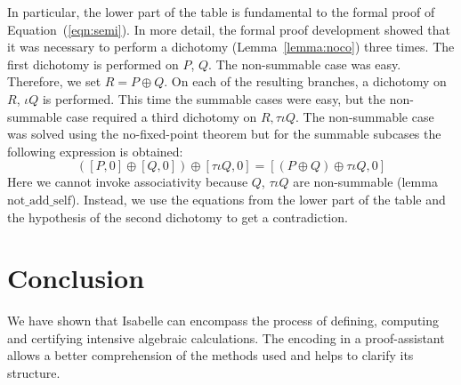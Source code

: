 \documentclass{llncs}
\begin{document}
In particular, the lower part of the table is fundamental to the formal
proof of
Equation~(\ref{eqn:semi}).
In more detail, the formal proof development showed that it was
necessary to perform a dichotomy (Lemma~\ref{lemma:noco}) three
times. The first dichotomy is performed on $P$, $Q$. The non-summable
case was easy. Therefore, we set $R = P \oplus Q$. On each of the
resulting branches, a dichotomy on $R$, $\iota Q$ is performed. This
time the summable cases were easy, but the non-summable case required a
third dichotomy on $R,\tau \iota Q$. The non-summable case was solved
using the no-fixed-point theorem but for the summable subcases the
following expression is obtained:
\[
([P,0] \oplus [Q,0]) \oplus [\tau \iota Q,0] =
[(P \oplus Q) \oplus \tau \iota Q,0]
\] 
Here we cannot invoke associativity because $Q$, $\tau \iota Q$ are
non-summable (lemma $\text{not\_add\_self}$).  Instead, we use the
equations from the lower part of the table and the hypothesis of the
second dichotomy to get a contradiction.

\section{Conclusion}

We have shown that Isabelle can encompass the process
of defining, computing and certifying intensive algebraic
calculations. The encoding in a proof-assistant allows a better
comprehension of the methods used and helps to clarify its structure.


\newpage


 

\end{document}

